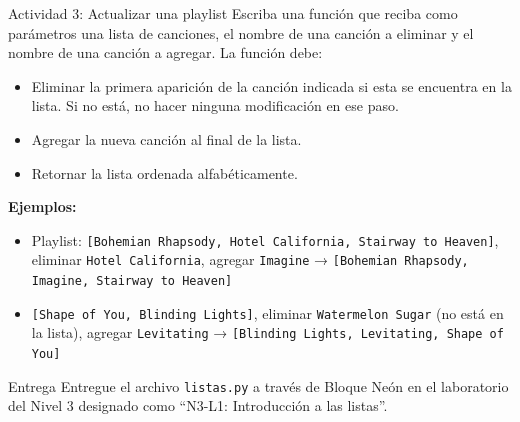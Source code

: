 \documentclass{ip-lab}
\begin{document}
\begin{sectionbox}{Actividad 3: Actualizar una playlist}
Escriba una función que reciba como parámetros una lista de canciones, el nombre de una canción a eliminar y el nombre de una canción a agregar. La función debe:

\begin{itemize}
    \item Eliminar la primera aparición de la canción indicada si esta se encuentra en la lista. Si no está, no hacer ninguna modificación en ese paso.
    \item Agregar la nueva canción al final de la lista.
    \item Retornar la lista ordenada alfabéticamente.
\end{itemize}

\textbf{Ejemplos:}
\begin{itemize}
    \item Playlist: \texttt{[\textquotedbl Bohemian Rhapsody\textquotedbl, \textquotedbl Hotel California\textquotedbl, \textquotedbl Stairway to Heaven\textquotedbl]}, eliminar \texttt{\textquotedbl Hotel California\textquotedbl}, agregar \texttt{\textquotedbl Imagine\textquotedbl} → \texttt{[\textquotedbl Bohemian Rhapsody\textquotedbl, \textquotedbl Imagine\textquotedbl, \textquotedbl Stairway to Heaven\textquotedbl]}
    \item \texttt{[\textquotedbl Shape of You\textquotedbl, \textquotedbl Blinding Lights\textquotedbl]}, eliminar \texttt{\textquotedbl Watermelon Sugar\textquotedbl} (no está en la lista), agregar \texttt{\textquotedbl Levitating\textquotedbl} → \texttt{[\textquotedbl Blinding Lights\textquotedbl, \textquotedbl Levitating\textquotedbl, \textquotedbl Shape of You\textquotedbl]}
\end{itemize}
\end{sectionbox}


\begin{sectionbox}{Entrega}
Entregue el archivo \texttt{listas.py} a través de Bloque Neón en el laboratorio del Nivel 3 designado como ``N3-L1: Introducción a las listas''.
\end{sectionbox}
\end{document}
